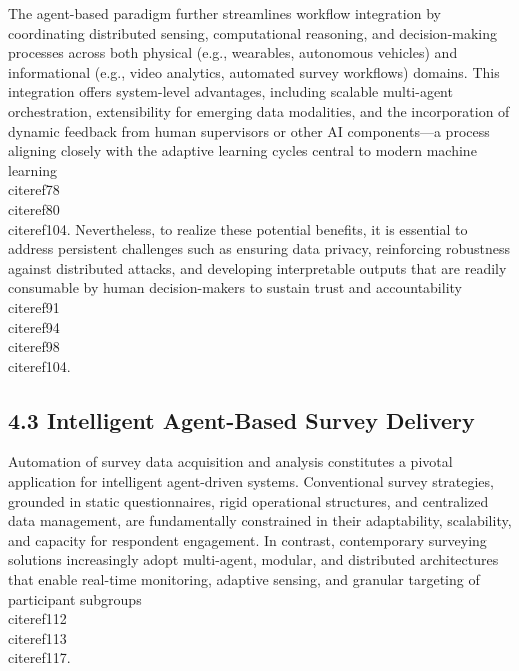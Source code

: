 \documentclass[11pt]{article}
\begin{document}
The agent-based paradigm further streamlines workflow integration by coordinating distributed sensing, computational reasoning, and decision-making processes across both physical (e.g., wearables, autonomous vehicles) and informational (e.g., video analytics, automated survey workflows) domains. This integration offers system-level advantages, including scalable multi-agent orchestration, extensibility for emerging data modalities, and the incorporation of dynamic feedback from human supervisors or other AI components—a process aligning closely with the adaptive learning cycles central to modern machine learning \\cite{ref78}\\cite{ref80}\\cite{ref104}. Nevertheless, to realize these potential benefits, it is essential to address persistent challenges such as ensuring data privacy, reinforcing robustness against distributed attacks, and developing interpretable outputs that are readily consumable by human decision-makers to sustain trust and accountability \\cite{ref91}\\cite{ref94}\\cite{ref98}\\cite{ref104}.

\subsection{4.3 Intelligent Agent-Based Survey Delivery}

Automation of survey data acquisition and analysis constitutes a pivotal application for intelligent agent-driven systems. Conventional survey strategies, grounded in static questionnaires, rigid operational structures, and centralized data management, are fundamentally constrained in their adaptability, scalability, and capacity for respondent engagement. In contrast, contemporary surveying solutions increasingly adopt multi-agent, modular, and distributed architectures that enable real-time monitoring, adaptive sensing, and granular targeting of participant subgroups \\cite{ref112}\\cite{ref113}\\cite{ref117}.
\end{document}
